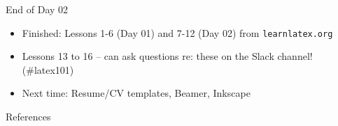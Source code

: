 \documentclass{beamer}
\begin{document}
{\begin{frame}{End of Day 02}
  \begin{itemize}
    \item Finished: Lessons 1-6 (Day 01) and 7-12 (Day 02) from \texttt{learnlatex.org}
    \item Lessons 13 to 16 -- can ask questions re: these on the Slack channel! (\#latex101)
    \item Next time: Resume/CV templates, Beamer, Inkscape
  \end{itemize}
\end{frame}

\begin{frame}{References}
  
  
\end{frame}

} %
\end{document}
